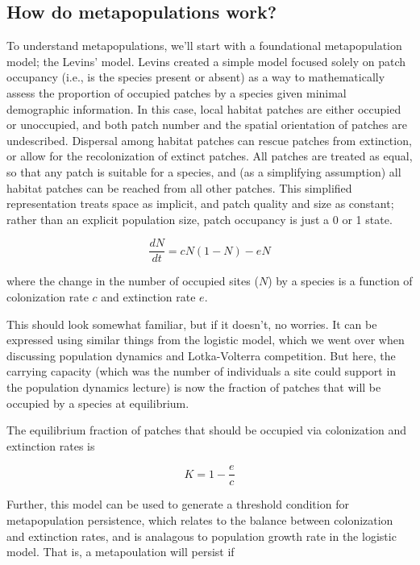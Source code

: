 \documentclass[12pt]{article}
\begin{document}
\bigskip


\subsection*{How do metapopulations work?}

To understand metapopulations, we'll start with a foundational metapopulation model; the Levins' model. Levins created a simple model focused solely on patch occupancy (i.e., is the species present or absent) as a way to mathematically assess the proportion of occupied patches by a species given minimal demographic information. In this case, local habitat patches are either occupied or unoccupied, and both patch number and the spatial orientation of patches are undescribed. Dispersal among habitat patches can rescue patches from extinction, or allow for the recolonization of extinct patches. All patches are treated as equal, so that any patch is suitable for a species, and (as a simplifying assumption) all habitat patches can be reached from all other patches. This simplified representation treats space as implicit, and patch quality and size as constant; rather than an explicit population size, patch occupancy is just a 0 or 1 state.


\begin{equation}
\frac{dN}{dt} = cN(1-N) - eN
\end{equation}

where the change in the number of occupied sites ($N$) by a species is a function of colonization rate $c$ and extinction rate $e$. 


This should look somewhat familiar, but if it doesn't, no worries. It can be expressed using similar things from the logistic model, which we went over when discussing population dynamics and Lotka-Volterra competition. But here, the carrying capacity (which was the number of individuals a site could support in the population dynamics lecture) is now the fraction of patches that will be occupied by a species at equilibrium. 

The equilibrium fraction of patches that should be occupied via colonization and extinction rates is 

\begin{equation}
K = 1 - \frac{e}{c}
\end{equation}

Further, this model can be used to generate a threshold condition for metapopulation persistence, which relates to the balance between colonization and extinction rates, and is analagous to population growth rate in the logistic model. That is, a metapoulation will persist if 
\end{document}
